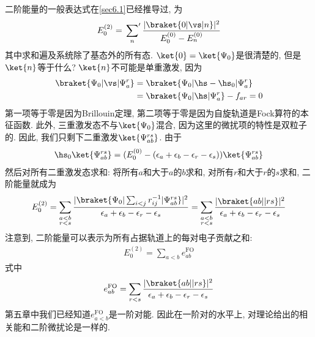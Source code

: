 二阶能量的一般表达式在\autoref{sec6.1}已经推导过, 
为
\begin{align}
E_0^{(2)} = \sideset{}{'}\sum_n\frac{|\braket{0|\vs|n}|^2}{E_0^{(0)} - E_n^{(0)}}
\end{align}
其中求和遍及系统除了基态外的所有态. 
$\ket{0} = \ket{\Psi_0}$是很清楚的, 
但是$\ket{n}$等于什么? $\ket{n}$不可能是单重激发, 
因为
\begin{align*}
\braket{\Psi_0|\vs|\Psi_a^r} & = \braket{\Psi_0|\hs-\hs_0|\Psi_a^r} \\
                             & = \braket{\Psi_0|\hs|\Psi_a^r} - f_{ar} = 0
\end{align*}
第一项等于零是因为Brillouin定理, 
第二项等于零是因为自旋轨道是Fock算符的本征函数. 
此外, 
三重激发态不与$\ket{\Psi_0}$混合, 
因为这里的微扰项的特性是双粒子的. 
因此, 
我们只剩下二重激发$\ket{\Psi_{ab}^{rs}}$. 
由于
\begin{align*}
\hs_0\ket{\Psi_{ab}^{rs}} = (E_0^{(0)} - (\epsilon_a + \epsilon_b - \epsilon_r - \epsilon_s))\ket{\Psi_{ab}^{rs}}
\end{align*}
然后对所有二重激发态求和: 将所有$a$和大于$a$的$b$求和, 
对所有$r$和大于$r$的$s$求和, 
二阶能量就成为
\begin{align}
E_0^{(2)} = \sum_{\substack{a<b\\r<s}} \frac{|\braket{\Psi_0|\sum_{i<j} r_{ij}^{-1}|\Psi_{ab}^{rs}}|^2}{\epsilon_a + \epsilon_b -\epsilon_r-\epsilon_s} = \sum_{\substack{a<b\\r<s}} \frac{|\braket{ab||rs}|^2}{\epsilon_a + \epsilon_b -\epsilon_r-\epsilon_s}
\end{align}
注意到, 
二阶能量可以表示为所有占据轨道上的每对电子贡献之和:
\begin{align*}
E_0^{(2)} = \sum_{a<b}e_{ab}^\mathrm{FO}
\end{align*}
式中
\begin{align*}
e_{ab}^{\mathrm{FO}} =  \sum_{r<s} \frac{|\braket{ab||rs}|^2}{\epsilon_a + \epsilon_b -\epsilon_r-\epsilon_s}
\end{align*}
第五章中我们已经知道$e_{a<b}^\mathrm{FO}$是一阶对能. 
因此在一阶对的水平上, 
对理论给出的相关能和二阶微扰论是一样的.


